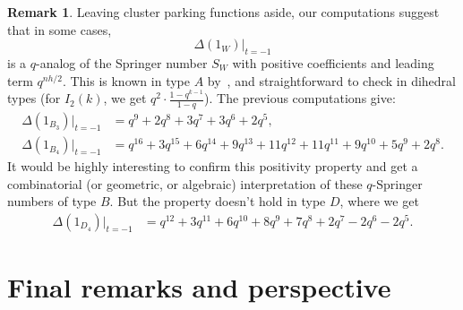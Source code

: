\documentclass[11pt]{article}
\theoremstyle{definition}
\newtheorem{rema}[theo]{Remark}
\begin{document}
\begin{rema}
    Leaving cluster parking functions aside, our computations suggest that in some cases,
    \[
        \varDelta(1_{W}) \big\vert_{t=-1}
    \]
    is a $q$-analog of the Springer number $S_W$ with positive coefficients and leading term $q^{nh/2}$.  This is known in type $A$ by~\cite{corteeljosuatvergesvandenwyngaerd}, and straightforward to check in dihedral types (for $I_2(k)$, we get $q^2\cdot\frac{1-q^{k-1}}{1-q}$).  The previous computations give:
    \begin{align*}
        \varDelta(1_{B_3}) \big\vert_{t=-1} &=
        q^9 + 2q^8 + 3q^7 + 3q^6 + 2q^5, \\
        \varDelta(1_{B_4}) \big\vert_{t=-1}
            &=
        q^{16} + 3q^{15} + 6q^{14} + 9q^{13} + 11q^{12} + 11q^{11} + 9q^{10} + 5q^{9} + 2q^{8}.  
    \end{align*}
    It would be highly interesting to confirm this positivity property and get a combinatorial (or geometric, or algebraic) interpretation of these $q$-Springer numbers of type $B$.  But the property doesn't hold in type $D$, where we get
    \begin{align*}
        \varDelta(1_{D_4}) \big\vert_{t=-1} &=
        q^{12} + 3q^{11} + 6q^{10} + 8q^{9} + 7q^{8} + 2q^{7} - 2q^{6} - 2q^{5}.
    \end{align*}\end{rema}


\section{Final remarks 
 and perspective}
\label{sec:final}
\end{document}
